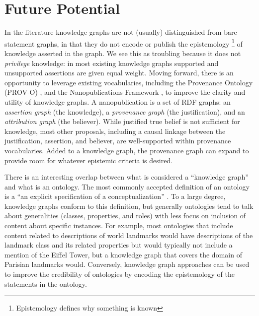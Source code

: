 \documentclass[runningheads,a4paper]{llncs}
\begin{document}

\section{Future Potential}

In the literature knowledge graphs are not (usually) distinguished from bare statement graphs, in that they do not encode or publish the epistemology \footnote{Epistemology defines why something is known} of knowledge asserted in the graph.
We see this as troubling because it does not {\em privilege} knowledge: in most existing knowledge graphs supported and unsupported assertions are given equal weight.
Moving forward, there is an opportunity to leverage existing vocabularies, including the Provenance Ontology (PROV-O) \cite{Moreau_2015}, and the Nanopublications Framework \cite{groth2010anatomy}, to improve the clarity and utility of knowledge graphs.
A nanopublication is a set of RDF graphs: an {\em assertion graph} (the knowledge), a {\em provenance graph} (the justification), and an {\em attribution graph} (the believer).
While justified true belief is not sufficient for knowledge, most other proposals, including a causal linkage between the justification, assertion, and believer, are well-supported within provenance vocabularies.
Added to a knowledge graph, the provenance graph can expand to provide room for whatever epistemic criteria is desired.

There is an interesting overlap between what is considered a ``knowledge graph'' and what is an ontology.
The most commonly accepted definition of an ontology is a ``an explicit specification of a conceptualization'' \cite{Gruber_1993}.
To a large degree, knowledge graphs conform to this definition, but generally ontologies tend to talk about generalities (classes, properties, and roles) with less focus on inclusion of content about specific instances.
For example, most ontologies that include content related to descriptions of world landmarks would have descriptions of the landmark class and its related properties but would typically not include a mention of the Eiffel Tower, but a knowledge graph that covers the domain of Parisian landmarks would.
Conversely, knowledge graph approaches can be used to improve the credibility of ontologies by encoding the epistemology of the statements in the ontology.
\end{document}
